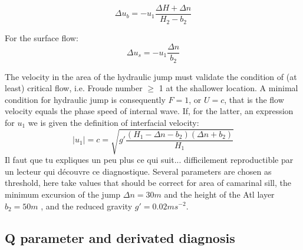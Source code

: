 \begin{equation}
\Delta u_b = -u_1 \frac{\Delta H + \Delta n}{H_2-b_2}
\end{equation}

For the surface flow:
\begin{equation}
\Delta u_s = - u_1\frac{\Delta n}{b_2}
\end{equation}

The velocity in the area of the hydraulic jump must validate the condition of (at least) critical flow, i.e. Froude number $\geq$ 1 at the shallower location. A minimal condition for hydraulic jump is consequently $F=1$, or $U=c$, that is the flow velocity equals the phase speed of internal wave. If, for the latter, \color{blue} an expression for $u_1$ we is given the definition of interfacial velocity: 
\begin{equation}
|u_1|=c=\sqrt{g' \frac{(H_1-\Delta n - b_2)(\Delta n + b_2)}{H_1}}
\end{equation}
 \color{green}Il faut que tu expliques un peu plus ce qui suit... difficilement reproductible par un lecteur qui découvre ce diagnostique. \color{black} 
Several parameters are chosen as threshold, here take values that should be correct for area of camarinal sill, the minimum excursion of the jump $\Delta n = 30m$ and the height of the Atl layer $b_2=50 m$ , and the reduced gravity $g'=0.02 m s^{-2}$.

\subsection{Q parameter and derivated diagnosis}

